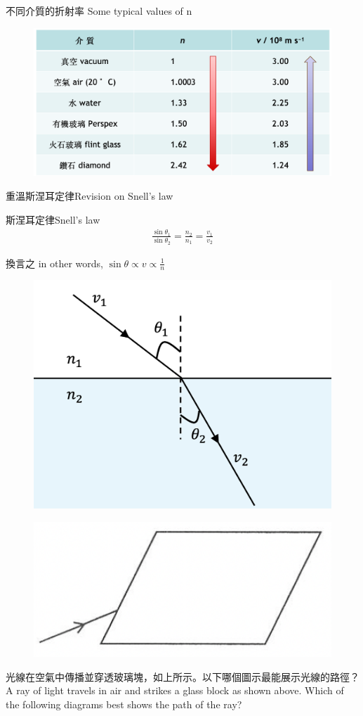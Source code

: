 \documentclass[beamer=true]{standalone}
\begin{document}
\begin{frame}{不同介質的折射率 Some typical values of n}
    \begin{figure}
        \centering
        \includegraphics[width=0.9\linewidth]{assets/1290831em1.png}
        
        
    \end{figure}
\end{frame}



\begin{frame}{重溫斯涅耳定律Revision on Snell's law}
    \begin{alertblock}
        {斯涅耳定律Snell's law}
        \begin{align*}
            \frac{\sin\theta_1}{\sin \theta_2}=\frac{n_2}{n_1}=\frac{v_1}{v_2}
        \end{align*}
    \end{alertblock}
    換言之 in other words, $\sin\theta\propto v\propto \frac{1}{n}$
    \begin{figure}
        \centering
        \includegraphics[width=0.5\linewidth]{assets/2109si91292.png}
    \end{figure}
\end{frame}

\begin{eg}
    \begin{figure}
        \centering
        \includegraphics[width=0.5\linewidth]{assets/92180931283128.png}
    \end{figure}
    光線在空氣中傳播並穿透玻璃塊，如上所示。以下哪個圖示最能展示光線的路徑？\\A ray of light travels in air and strikes a glass block as shown above. Which of the following diagrams best shows the path of the ray?
\end{eg}
\end{document}
